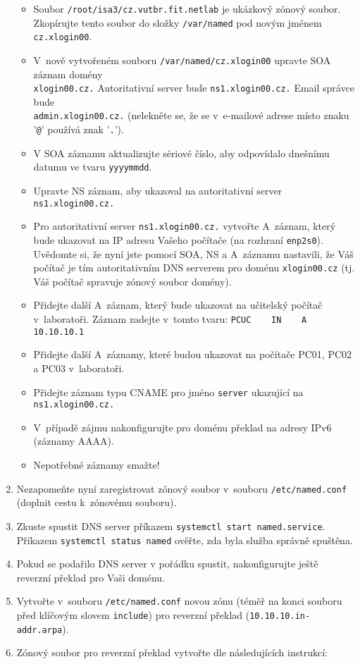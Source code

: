 \begin{enumerate}
    \begin{itemize}
      \item Soubor {\tt /root/isa3/cz.vutbr.fit.netlab} je ukázkový zónový soubor.\\
            Zkopírujte tento soubor do složky {\tt /var/named} pod novým jménem {\tt cz.xlogin00}.
      \item V~nově vytvořeném souboru {\tt /var/named/cz.xlogin00} upravte SOA záznam domény\\ {\tt xlogin00.cz.} Autoritativní server bude {\tt ns1.xlogin00.cz.}
            Email správce bude\\ {\tt admin.xlogin00.cz.} (nelekněte se, že se v~e-mailové adrese místo znaku '{\tt @}' používá znak '{\tt .}').
      \item V SOA záznamu aktualizujte sériové číslo, aby odpovídalo dnešnímu datumu ve tvaru {\tt yyyymmdd}.
      \item Upravte NS záznam, aby ukazoval na autoritativní server {\tt ns1.xlogin00.cz.}
      \item Pro autoritativní server {\tt ns1.xlogin00.cz.} vytvořte A~záznam, který bude ukazovat na IP adresu Vašeho počítače (na rozhraní {\tt enp2s0}).
            Uvědomte si, že nyní jste pomocí SOA, NS a A~záznamu nastavili, že Váš počítač je tím autoritativním DNS serverem pro doménu {\tt xlogin00.cz} (tj. Váš počítač spravuje zónový soubor domény).
      \item Přidejte další A~záznam, který bude ukazovat na učitelský počítač v~laboratoři. Záznam zadejte v~tomto tvaru:
            \verb|PCUC    IN    A    10.10.10.1|
      \item Přidejte další A~záznamy, které budou ukazovat na počítače PC01, PC02 a PC03 v~laboratoři.
      \item Přidejte záznam typu CNAME pro jméno {\tt server} ukazující na {\tt ns1.xlogin00.cz.}
      \item V~případě zájmu nakonfigurujte pro doménu překlad na adresy IPv6 (záznamy AAAA).
      \item Nepotřebné záznamy smažte!
    \end{itemize}

  \item Nezapomeňte nyní zaregistrovat zónový soubor v~souboru {\tt /etc/named.conf} (doplnit cestu k~zónovému souboru).
  \item Zkuste spustit DNS server příkazem {\tt systemctl start named.service}.
    Příkazem {\tt systemctl status named} ověřte, zda byla služba správně spuštěna.
  \item Pokud se podařilo DNS server v pořádku spustit, nakonfigurujte ještě reverzní překlad pro Vaši doménu.
  \item Vytvořte v~souboru {\tt /etc/named.conf} novou zónu (téměř na konci souboru před klíčovým slovem {\tt include}) pro reverzní překlad ({\tt 10.10.10.in-addr.arpa}).
  \item Zónový soubor pro reverzní překlad vytvořte dle následujících instrukcí:
  

\end{enumerate}
